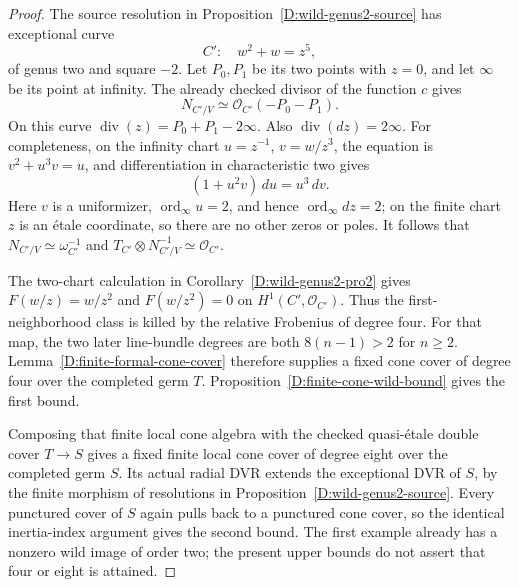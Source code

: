 \begin{proof}
The source resolution in
Proposition~\ref{D:wild-genus2-source} has exceptional curve
\[
                   C':\quad w^2+w=z^5,
\]
of genus two and square $-2$.  Let $P_0,P_1$ be its two
points with $z=0$, and let $\infty$ be its point at infinity.
The already checked divisor of the function $c$ gives
\[
                    N_{C'/V}\simeq\mathcal O_{C'}(-P_0-P_1).
\]
On this curve
$\operatorname{div}(z)=P_0+P_1-2\infty$.
Also $\operatorname{div}(dz)=2\infty$.  For completeness,
on the infinity chart $u=z^{-1}$, $v=w/z^3$, the equation
is $v^2+u^3v=u$, and differentiation in characteristic two
gives
\[
                  (1+u^2v)\,du=u^3\,dv.
\]
Here $v$ is a uniformizer, $\operatorname{ord}_\infty u=2$,
and hence $\operatorname{ord}_\infty dz=2$; on the finite
chart $z$ is an \'etale coordinate, so there are no other
zeros or poles.  It follows that
$N_{C'/V}\simeq\omega_{C'}^{-1}$ and
$T_{C'}\otimes N_{C'/V}^{-1}\simeq\mathcal O_{C'}$.

The two-chart calculation in
Corollary~\ref{D:wild-genus2-pro2} gives
$F(w/z)=w/z^2$ and $F(w/z^2)=0$ on
$H^1(C',\mathcal O_{C'})$.  Thus the first-neighborhood
class is killed by the relative Frobenius of degree four.
For that map, the two later line-bundle degrees are both
$8(n-1)>2$ for $n\geq2$.  Lemma~\ref{D:finite-formal-cone-cover}
therefore supplies a fixed cone cover of degree four
over the completed germ $T$.
Proposition~\ref{D:finite-cone-wild-bound} gives the first
bound.

Composing that finite local cone algebra with the checked
quasi-\'etale double cover $T\to S$ gives a fixed finite
local cone cover of degree eight over the completed germ
$S$.  Its actual radial DVR extends the exceptional
DVR of $S$, by the finite morphism of resolutions in
Proposition~\ref{D:wild-genus2-source}.  Every punctured
cover of $S$ again pulls back to a punctured cone cover,
so the identical inertia-index argument gives the
second bound.  The first example already has a nonzero
wild image of order two; the present upper bounds do
not assert that four or eight is attained.
\end{proof}
